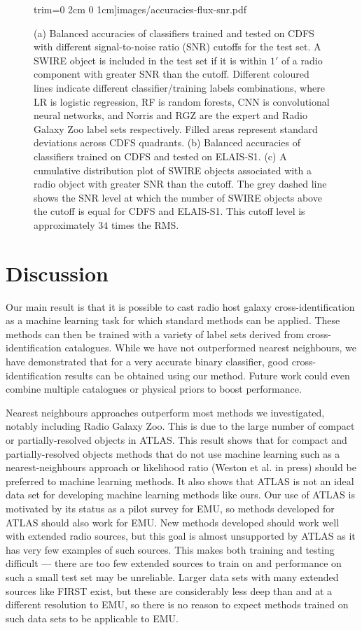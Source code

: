 \documentclass[fleqn,usenatbib,usedcolumn]{mnras}
\begin{document}
\begin{figure}
                     trim={0 2cm 0 1cm}]{images/accuracies-flux-snr.pdf}
    \caption{(a) Balanced accuracies of classifiers trained and tested on CDFS
      with different signal-to-noise ratio (SNR) cutoffs for the test set. A
      SWIRE object is included in the test set if it is within $1'$ of a radio
      component with greater SNR than the cutoff. Different coloured lines
      indicate different classifier/training labels combinations, where LR is
      logistic regression, RF is random forests, CNN is convolutional neural
      networks, and Norris and RGZ are the expert and Radio Galaxy Zoo label
      sets respectively. Filled areas represent standard deviations across
      CDFS quadrants. (b) Balanced accuracies of classifiers trained on CDFS
      and tested on ELAIS-S1. (c) A cumulative distribution plot of SWIRE
      objects associated with a radio object with greater SNR than the cutoff.
      The grey dashed line shows the SNR level at which the number of SWIRE
      objects above the cutoff is equal for CDFS and ELAIS-S1. This cutoff level
      is approximately $34$ times the RMS.}
    \label{fig:accuracies-flux}
  \end{figure}

\section{Discussion}

  Our main result is that it is possible to cast radio host galaxy
  cross-identification as a machine learning task for which standard methods
  can be applied. These methods can then be trained with a variety of label
  sets derived from cross-identification catalogues. While we have not outperformed nearest neighbours, we have demonstrated that for a very accurate binary classifier, good cross-identification results can be obtained using our method. Future work could even combine multiple catalogues or physical priors to boost performance.

  Nearest neighbours approaches outperform most methods we investigated, notably including Radio Galaxy Zoo. This is due to the large number of compact or partially-resolved objects in ATLAS. This result shows that for compact and partially-resolved objects methods that do not use machine learning such as a nearest-neighbours approach or likelihood ratio (Weston et al. in press) should be preferred to machine learning methods. It also shows that ATLAS is not an ideal data set for developing machine learning methods like ours. Our use of ATLAS is motivated by its status as a pilot survey for EMU, so methods developed for ATLAS should also work for EMU. New methods developed should work well with extended radio sources, but this goal is almost unsupported by ATLAS as it has very few examples of such sources. This makes both training and testing difficult --- there are too few extended sources to train on and performance on such a small test set may be unreliable. Larger data sets with many extended sources like FIRST exist, but these are considerably less deep than and at a different resolution to EMU, so there is no reason to expect methods trained on such data sets to be applicable to EMU.
\end{document}
